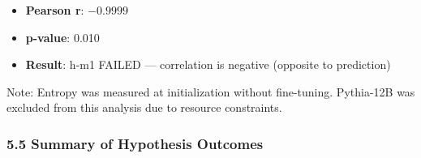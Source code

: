 \begin{itemize}
\item \textbf{Pearson r}: $-0.9999$
\item \textbf{p-value}: 0.010
\item \textbf{Result}: h-m1 FAILED --- correlation is negative (opposite to prediction)
\end{itemize}

Note: Entropy was measured at initialization without fine-tuning. Pythia-12B was excluded from this analysis due to resource constraints.

\subsubsection{5.5 Summary of Hypothesis Outcomes}

\begin{table}[htbp]
\centering
{}
\end{table}
